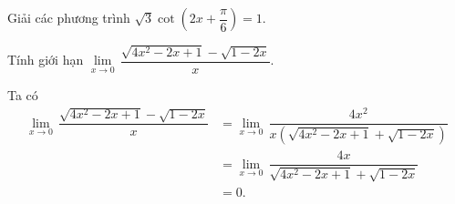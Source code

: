 \TL
\begin{ex}%
Giải các phương trình $\sqrt{3}\cot \left(2x+\dfrac{\pi}{6}\right)=1$.
\end{ex}

\begin{ex}%
Tính giới hạn $ \lim\limits_{x\to 0}\,\dfrac{\sqrt{4x^2-2x+1}-\sqrt{1-2x}}{x}$.
\loigiai
{
Ta có
\begin{align*}
\lim\limits_{x\to 0}\,\dfrac{\sqrt{4x^2-2x+1}-\sqrt{1-2x}}{x}&= \lim\limits_{x\to 0}\,\dfrac{4x^2}{x\left( \sqrt{4x^2-2x+1}+\sqrt{1-2x} \right)}\\
&= \lim\limits_{x\to 0}\,\dfrac{4x}{\sqrt{4x^2-2x+1}+\sqrt{1-2x}}\\
&=0.
\end{align*}

}
\end{ex}

